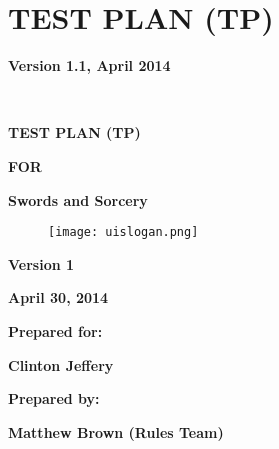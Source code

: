 \chapter{TEST PLAN (TP)}

{\centering{}\bfseries\color{black}
Version 1.1, April 2014
\par}

\ 

\bigskip

{\centering\bfseries\color{black}
TEST PLAN (TP)}

{\centering{}\bfseries\color{black}
FOR
\par}


\bigskip

{\centering{}\bfseries\color{black}
Swords and Sorcery
\par}


\bigskip


\bigskip


\bigskip

\begin{figure}
\centering
\texttt{[image: uislogan.png]}
\end{figure}

\bigskip


\bigskip


\bigskip


\bigskip

{\centering{}\bfseries\color{black}
Version 1
\par}

{\centering{}\bfseries\color{black}
April 30, 2014
\par}


\bigskip


\bigskip

{\centering{}\bfseries\color{black}
Prepared for:
\par}

{\centering{}\bfseries\color{black}
Clinton Jeffery
\par}


\bigskip


\bigskip

{\centering{}\bfseries\color{black}
Prepared by:
\par}

{\centering{}\bfseries\color{black}
Matthew Brown (Rules Team)
\par}

